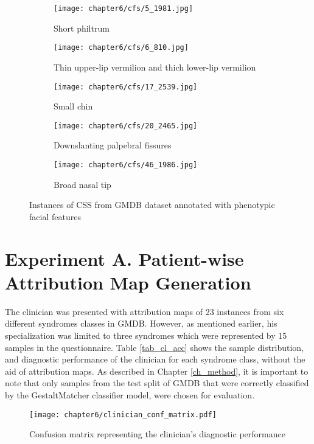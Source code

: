 \documentclass[../report.tex]{subfiles}
\begin{document}
	 \begin{figure}[H]\label{fig_cfs}
	 	\centering
	 	\begin{subfigure}[t]{0.17\textwidth}
	 		\centering
	 		\texttt{[image: chapter6/cfs/5\_1981.jpg]}
	 		\caption{Short philtrum}
	 	\end{subfigure}
	 	\begin{subfigure}[t]{0.17\textwidth}
	 		\centering
	 		\texttt{[image: chapter6/cfs/6\_810.jpg]}
	 		\caption{Thin upper-lip vermilion and thich lower-lip vermilion }
	 	\end{subfigure}	
	 	\begin{subfigure}[t]{0.17\textwidth}
	 		\centering
	 		\texttt{[image: chapter6/cfs/17\_2539.jpg]}
	 		\caption{Small chin}
	 	\end{subfigure}	
	 	\begin{subfigure}[t]{0.17\textwidth}
	 		\centering
	 		\texttt{[image: chapter6/cfs/20\_2465.jpg]}
	 		\caption{Downslanting palpebral fissures}
	 	\end{subfigure}	
	 	\begin{subfigure}[t]{0.17\textwidth}
	 		\centering
	 		\texttt{[image: chapter6/cfs/46\_1986.jpg]}
	 		\caption{Broad nasal tip}
	 	\end{subfigure}	
	 	\caption[Instances of HPMRS from GMDB dataset]{Instances of CSS from GMDB dataset annotated with phenotypic facial features}
	 \end{figure}
	 
	 
    \section{Experiment A. Patient-wise Attribution Map Generation}
    The clinician was presented with attribution maps of 23 instances from six different syndromes classes in GMDB. However, as mentioned earlier, his specialization was limited to three syndromes which were represented by 15 samples in the questionnaire. Table \ref{tab_cl_acc} shows the sample distribution, and diagnostic performance of the clinician for each syndrome class, without the aid of attribution maps. As described in  Chapter \ref{ch_method}, it is important to note that only samples from the test split of GMDB that were correctly classified by the GestaltMatcher classifier model, were chosen for evaluation. 
    
    
   	\begin{figure}[H]
   	\centering
   	\texttt{[image: chapter6/clinician\_conf\_matrix.pdf]}	
   	\caption[Confusion matrix representing the clinician's
   	diagnostic performance]{Confusion matrix representing the clinician's
   	diagnostic performance}
   \label{fig_clin_perf_mtx} 
   \end{figure}
    
\end{document}

